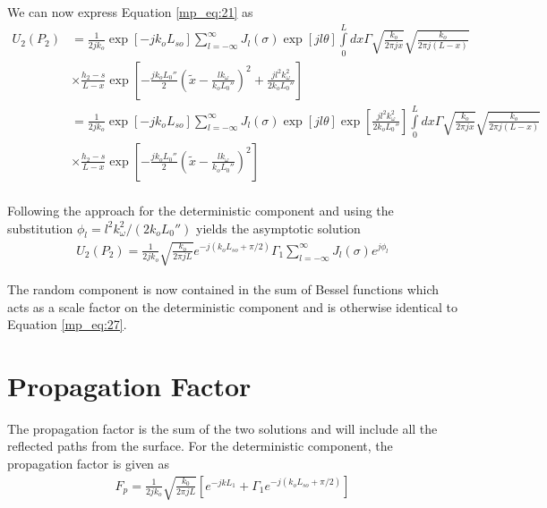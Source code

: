 \noindent We can now express Equation \ref{mp_eq:21} as
\begin{equation}
\begin{aligned}
U_2(P_2)&= \frac{1}{2jk_o}\exp\left[-jk_oL_{so}\right]\sum_{l=-\infty}^{\infty}J_l(\sigma)\exp\left[jl\theta\right]\int\limits_{0}^{L}dx\Gamma \sqrt{\frac{k_o}{2\pi jx}}\sqrt{\frac{k_o}{2\pi j (L-x)}}\\ &\times\frac{h_2-s}{L-x}\exp\left[-\frac{jk_oL_0''}{2}\left(\tilde{x} - \frac{lk_{\omega}}{k_oL_0''} \right)^2 + \frac{jl^2k_{\omega}^2}{2k_oL_0''}\right] \\
&= \frac{1}{2jk_o}\exp\left[-jk_oL_{so}\right]\sum_{l=-\infty}^{\infty}J_l(\sigma)\exp\left[jl\theta\right]\exp\left[\frac{jl^2k_{\omega}^2}{2k_oL_0''}\right]\int\limits_{0}^{L}dx\Gamma \sqrt{\frac{k_o}{2\pi jx}}\sqrt{\frac{k_o}{2\pi j (L-x)}}\\ &\times\frac{h_2-s}{L-x}\exp\left[-\frac{jk_oL_0''}{2}\left(\tilde{x} - \frac{lk_{\omega}}{k_oL_0''} \right)^2\right] \\
\label{mp_eq:34}
\end{aligned}
\end{equation}
\renewcommand{\baselinestretch}{2} \small\normalsize

Following the approach for the deterministic component and using the substitution $\phi_l = l^2k_{\omega}^2/(2k_oL_0'')$ yields the asymptotic solution
\begin{equation}
\begin{aligned}
\boxed{U_2(P_2) = \frac{1}{2jk_o}\sqrt{\frac{k_o}{2\pi jL}}e^{-j\left(k_oL_{so}+\pi/2\right)}\Gamma_1\sum_{l=-\infty}^{\infty}J_l(\sigma)e^{j\phi_l}}
\label{mp_eq:35}
\end{aligned}
\end{equation}
\renewcommand{\baselinestretch}{2} \small\normalsize

The random component is now contained in the sum of Bessel functions which acts as a scale factor on the deterministic component and is otherwise identical to Equation \ref{mp_eq:27}.

\section{Propagation Factor}
The propagation factor is the sum of the two solutions and will include all the reflected paths from the surface. For the deterministic component, the propagation factor is given as
\begin{equation}
\begin{gathered}
F_p= \frac{1}{2jk_o}\sqrt{\frac{k_0}{2\pi jL}}\left[e^{-jkL_1} + \Gamma_1e^{-j\left(k_oL_{so}+\pi/2\right)}\right] \\
\end{gathered}
\label{mp_eq:27b}
\end{equation}
\renewcommand{\baselinestretch}{2} \small\normalsize

